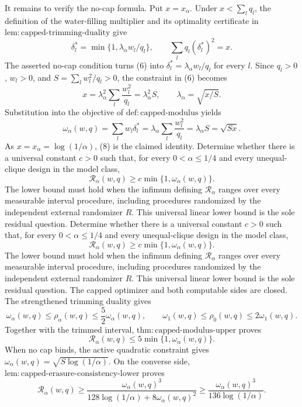 It remains to verify the no-cap formula.  Put \(x=x_\alpha\).  Under \(x<\sum_lq_l\), the definition of the water-filling multiplier and its optimality certificate in \(\mathrm{lem{:}capped\text{-}trimming\text{-}duality}\) give
\[
 \delta_l^*=\min\{1,\lambda_\alpha w_l/q_l\},
 \qquad
 \sum_lq_l(\delta_l^*)^2=x.
\tag{6}
\]
The asserted no-cap condition turns (6) into \(\delta_l^*=\lambda_\alpha w_l/q_l\) for every \(l\).  Since \(q_l>0\), \(w_l>0\), and
\(S=\sum_lw_l^2/q_l>0\), the constraint in (6) becomes
\[
 x=\lambda_\alpha^2\sum_l\frac{w_l^2}{q_l}
  =\lambda_\alpha^2S,
 \qquad
 \lambda_\alpha=\sqrt{x/S}.
\tag{7}
\]
Substitution into the objective of \(\mathrm{def{:}capped\text{-}modulus}\) yields
\[
 \omega_\alpha(w,q)
 =\sum_lw_l\delta_l^*
 =\lambda_\alpha\sum_l\frac{w_l^2}{q_l}
 =\lambda_\alpha S
 =\sqrt{Sx}.
\tag{8}
\]
As \(x=x_\alpha=\log(1/\alpha)\), (8) is the claimed identity.
Determine whether there is a universal constant \(c>0\) such that, for every \(0<\alpha\le1/4\) and every unequal-clique design in the model class,
\[
 \mathcal R_\alpha(w,q)
 \ge c\min\{1,\omega_\alpha(w,q)\}.
\]
The lower bound must hold when the infimum defining \(\mathcal R_\alpha\) ranges over every measurable interval procedure, including procedures randomized by the independent external randomizer \(R\).  This universal linear lower bound is the sole residual question.
Determine whether there is a universal constant \(c>0\) such that, for every \(0<\alpha\le1/4\) and every unequal-clique design in the model class,
\[
 \mathcal R_\alpha(w,q)
 \ge c\min\{1,\omega_\alpha(w,q)\}.
\]
The lower bound must hold when the infimum defining \(\mathcal R_\alpha\) ranges over every measurable interval procedure, including procedures randomized by the independent external randomizer \(R\).  This universal linear lower bound is the sole residual question.
The capped optimizer and both computable sides are closed.  The strengthened trimming duality gives
\[
 \omega_\alpha(w,q)\le\rho_\alpha(w,q)
 \le\frac52\omega_\alpha(w,q),
 \qquad
 \omega_1(w,q)\le\rho_0(w,q)\le2\omega_1(w,q).
\]
Together with the trimmed interval, \(\mathrm{thm{:}capped\text{-}modulus\text{-}upper}\) proves
\[
 \mathcal R_\alpha(w,q)
 \le5\min\{1,\omega_\alpha(w,q)\}.
\]
When no cap binds, the active quadratic constraint gives
\(\omega_\alpha(w,q)=\sqrt{S\log(1/\alpha)}\).  On the converse side, \(\mathrm{lem{:}capped\text{-}erasure\text{-}consistency\text{-}lower}\) proves
\[
 \mathcal R_\alpha(w,q)
 \ge
 \frac{\omega_\alpha(w,q)^3}
 {128\log(1/\alpha)+8\omega_\alpha(w,q)^2}
 \ge
 \frac{\omega_\alpha(w,q)^3}{136\log(1/\alpha)}.
\]
